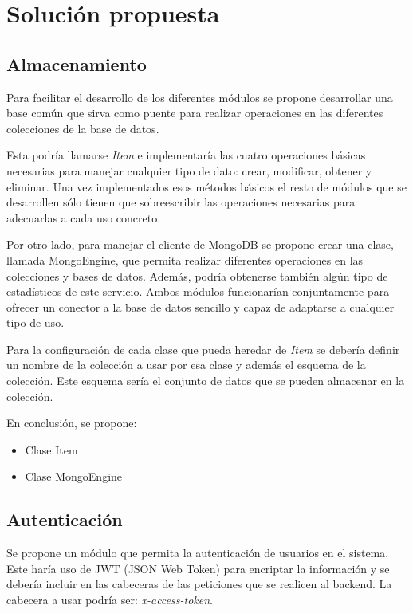 \chapter{Solución propuesta}


\section{Almacenamiento}

Para facilitar el desarrollo de los diferentes módulos se propone desarrollar una base común que sirva como puente para realizar operaciones en las diferentes colecciones de la base de datos.

\bigskip
Esta podría llamarse \textit{Item} e implementaría las cuatro operaciones básicas necesarias para manejar cualquier tipo de dato: crear, modificar, obtener y eliminar. Una vez implementados esos métodos básicos el resto de módulos que se desarrollen sólo tienen que sobreescribir las operaciones necesarias para adecuarlas a cada uso concreto.

\bigskip
Por otro lado, para manejar el cliente de MongoDB se propone crear una clase, llamada MongoEngine, que permita realizar diferentes operaciones en las colecciones y bases de datos. Además, podría obtenerse también algún tipo de estadísticos de este servicio. Ambos módulos funcionarían conjuntamente para ofrecer un conector a la base de datos sencillo y capaz de adaptarse a cualquier tipo de uso.

\bigskip
Para la configuración de cada clase que pueda heredar de \textit{Item} se debería definir un nombre de la colección a usar por esa clase y además el esquema de la colección. Este esquema sería el conjunto de datos que se pueden almacenar en la colección.


\bigskip
En conclusión, se propone:
\begin{itemize}
	\item Clase Item
	\item Clase MongoEngine
\end{itemize}


\section{Autenticación}

Se propone un módulo que permita la autenticación de usuarios en el sistema. Este haría uso de JWT (JSON Web Token) para encriptar la información y se debería incluir en las cabeceras de las peticiones que se realicen al backend. La cabecera a usar podría ser: \textit{x-access-token}.


